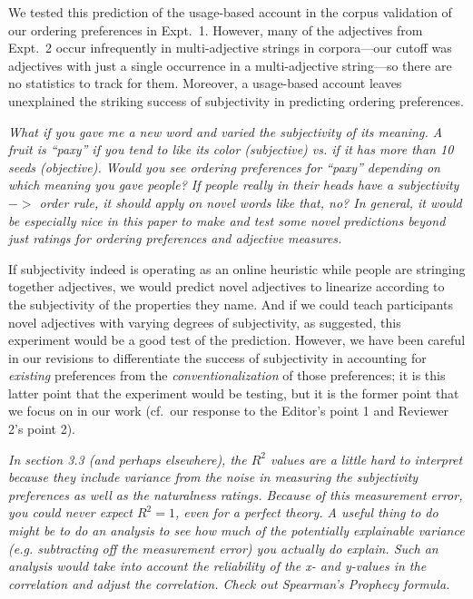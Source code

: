 \documentclass[12pt]{article}
\begin{document}
We tested this prediction of the usage-based account in the corpus validation of our ordering preferences in Expt.~1. However, many of the adjectives from Expt.~2 occur infrequently in multi-adjective strings in corpora---our cutoff was adjectives with just a single occurrence in a multi-adjective string---so there are no statistics to track for them. Moreover, a usage-based account leaves unexplained the striking success of subjectivity in predicting ordering preferences.
	
\item \emph{What if you gave me a new word and varied the subjectivity of its meaning. A fruit is ``paxy'' if you tend to like its color (subjective) vs. if it has more than 10 seeds (objective). Would you see ordering preferences for ``paxy'' depending on which meaning you gave people? If people really in their heads have a subjectivity $->$ order rule, it should apply on novel words like that, no? In general, it would be especially nice in this paper to make and test some novel predictions beyond just ratings for ordering preferences and adjective measures.}

If subjectivity indeed is operating as an online heuristic while people are stringing together adjectives, we would predict novel adjectives to linearize according to the subjectivity of the properties they name. And if we could teach participants novel adjectives with varying degrees of subjectivity, as suggested, this experiment would be a good test of the prediction. However, we have been careful in our revisions to differentiate the success of subjectivity in accounting for \emph{existing} preferences from the \emph{conventionalization} of those preferences; it is this latter point that the experiment would be testing, but it is the former point that we focus on in our work (cf.~our response to the Editor's point 1 and Reviewer 2's point 2).


\item \emph{In section 3.3 (and perhaps elsewhere), the $R^2$ values are a little hard to interpret because they include variance from the noise in measuring the subjectivity preferences as well as the naturalness ratings. Because of this measurement error, you could never expect $R^2=1$, even for a perfect theory. A useful thing to do might be to do an analysis to see how much of the potentially explainable variance (e.g. subtracting off the measurement error) you actually do explain. Such an analysis would take into account the reliability of the x- and y-values in the correlation and adjust the correlation. Check out Spearman's Prophecy formula.}
\end{document}
